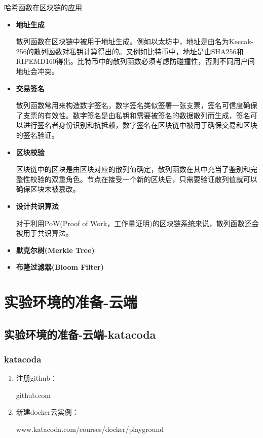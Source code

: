 \documentclass[11pt]{beamer}
\begin{document}
\begin{frame}{哈希函数在区块链的应用}
	\begin{multicols}{2}
		\begin{itemize}
			\item \textbf{地址生成}
			
			{\tiny 散列函数在区块链中被用于地址生成。例如以太坊中，地址是由名为Keccak-256的散列函数对私钥计算得出的。又例如比特币中，地址是由SHA256和RIPEMD160得出。比特币中的散列函数必须考虑防碰撞性，否则不同用户间地址会冲突。}
			
			\item \textbf{交易签名}
			
			{\tiny 散列函数常用来构造数字签名，数字签名类似签署一张支票，签名可信度确保了支票的有效性。数字签名是由私钥和需要被签名的数据散列而生成，签名可以进行签名者身份识别和抗抵赖，数字签名在区块链中被用于确保交易和区块的签名验证。}
			
			\item \textbf{区块校验}
			
			{\tiny 区块链中的区块是由区块对应的散列值确定，散列函数在其中充当了鉴别和完整性校验的双重角色。节点在接受一个新的区块后，只需要验证散列值就可以确保区块未被篡改。}
			
			\item \textbf{设计共识算法}
			
			{\tiny 对于利用PoW(Proof of Work，工作量证明)的区块链系统来说，散列函数还会被用于共识算法。}
			
			\item \textbf{默克尔树(Merkle Tree)}
			
			\item \textbf{布隆过滤器(Bloom Filter)}
		\end{itemize}
	\end{multicols}
\end{frame}

\section{实验环境的准备-云端}
\subsection{实验环境的准备-云端-katacoda}
\begin{frame}
	\frametitle{katacoda}
	\begin{enumerate}
		\item 注册github：
		
		github.com
		\item 新建docker云实例：
		
		www.katacoda.com/courses/docker/playground
	\end{enumerate}

\end{frame}
\end{document}
